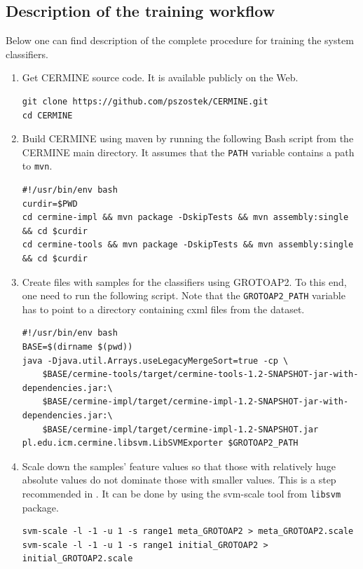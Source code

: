 \blankpage
\begin{appendix}
\noappendicestocpagenum
\addappheadtotoc
\chapter{Description of the training workflow}
\label{appendix:training_workflow}
Below one can find description of the complete procedure for training the system classifiers.
\begin{enumerate}
\item Get CERMINE source code. It is available publicly on the Web.
\lstset{language=bash}
\begin{lstlisting}
git clone https://github.com/pszostek/CERMINE.git
cd CERMINE
\end{lstlisting}
\item Build CERMINE using maven by running the following Bash script from the CERMINE main directory. It assumes that the \verb+PATH+ variable contains a path to \verb+mvn+.
\begin{lstlisting}
#!/usr/bin/env bash
curdir=$PWD
cd cermine-impl && mvn package -DskipTests && mvn assembly:single && cd $curdir
cd cermine-tools && mvn package -DskipTests && mvn assembly:single && cd $curdir
\end{lstlisting}
\item Create files with samples for the classifiers using GROTOAP2. To this end, one need to run the following script. Note that the \verb+GROTOAP2_PATH+ variable has to point to a directory containing cxml files from the dataset.
\begin{lstlisting}
#!/usr/bin/env bash
BASE=$(dirname $(pwd))
java -Djava.util.Arrays.useLegacyMergeSort=true -cp \
    $BASE/cermine-tools/target/cermine-tools-1.2-SNAPSHOT-jar-with-dependencies.jar:\
    $BASE/cermine-impl/target/cermine-impl-1.2-SNAPSHOT-jar-with-dependencies.jar:\
    $BASE/cermine-impl/target/cermine-impl-1.2-SNAPSHOT.jar pl.edu.icm.cermine.libsvm.LibSVMExporter $GROTOAP2_PATH
\end{lstlisting}
\item Scale down the samples' feature values so that those with relatively huge absolute values do not dominate those with smaller values. This is a step recommended in \cite{Chih-WeiHsu2010}. It can be done by using the svm-scale tool from \verb+libsvm+ package.
\begin{lstlisting}
svm-scale -l -1 -u 1 -s range1 meta_GROTOAP2 > meta_GROTOAP2.scale
svm-scale -l -1 -u 1 -s range1 initial_GROTOAP2 > initial_GROTOAP2.scale

\end{lstlisting}
\end{enumerate}
\end{appendix}
